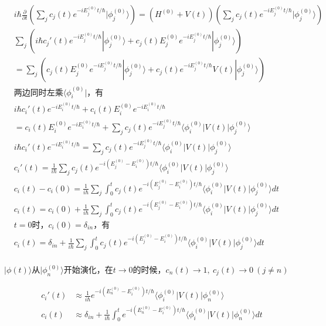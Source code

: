\begin{equation}
    \begin{split}
    & i\hbar \frac{\partial}{\partial t}(\sum_{j} c_j(t) e^{-iE^{(0)}_j t/\hbar} |\phi^{(0)}_j\rangle) = (H^{(0)}+V(t))(\sum_{j} c_j(t) e^{-iE^{(0)}_j t/\hbar} |\phi^{(0)}_j\rangle)\\
    & \sum_{j} (i\hbar c_j'(t) e^{-iE^{(0)}_j t/\hbar} |\phi^{(0)}_j\rangle + c_j(t) E^{(0)}_j e^{-iE^{(0)}_j t/\hbar} |\phi^{(0)}_j\rangle) \\
    &= \sum_{j} (c_j(t) E^{(0)}_j e^{-iE^{(0)}_j t/\hbar} |\phi^{(0)}_j\rangle +  c_j(t) e^{-iE^{(0)}_j t/\hbar} V(t) |\phi^{(0)}_j\rangle)\\
    & \text{两边同时左乘} \langle\phi^{(0)}_i|\text{，有}\\
    &i\hbar c_i'(t) e^{-iE^{(0)}_i t/\hbar} + c_i(t) E^{(0)}_i e^{-iE^{(0)}_i t/\hbar}\\
    &= c_i(t) E^{(0)}_i e^{-iE^{(0)}_i t/\hbar} + \sum_{j} c_j(t) e^{-iE^{(0)}_j t/\hbar} \langle \phi^{(0)}_i| V(t) |\phi^{(0)}_j\rangle \\
    &i\hbar c_i'(t) e^{-iE^{(0)}_i t/\hbar} = \sum_{j} c_j(t) e^{-iE^{(0)}_j t/\hbar} \langle \phi^{(0)}_i| V(t) |\phi^{(0)}_j\rangle \\
    & c_i'(t) = \frac{1}{i\hbar} \sum_{j} c_j(t) e^{-i(E^{(0)}_j - E^{(0)}_i) t/\hbar} \langle \phi^{(0)}_i| V(t) |\phi^{(0)}_j\rangle\\
    & c_i(t) - c_i(0) = \frac{1}{i\hbar} \sum_{j} \int_{0}^{t} c_j(t) e^{-i(E^{(0)}_j - E^{(0)}_i) t/\hbar} \langle \phi^{(0)}_i| V(t) |\phi^{(0)}_j\rangle dt\\
    & c_i(t) = c_i(0) + \frac{1}{i\hbar} \sum_{j} \int_{0}^{t} c_j(t) e^{-i(E^{(0)}_j - E^{(0)}_i) t/\hbar} \langle \phi^{(0)}_i| V(t) |\phi^{(0)}_j\rangle dt\\
    & t=0 \text{时，} c_i(0) = \delta_{in} \text{，有}\\
    & c_i(t) = \delta_{in} + \frac{1}{i\hbar} \sum_{j} \int_{0}^{t} c_j(t) e^{-i(E^{(0)}_j - E^{(0)}_i) t/\hbar} \langle \phi^{(0)}_i| V(t) |\phi^{(0)}_j\rangle dt\\
    \end{split}
\end{equation}

$|\phi(t)\rangle$从$|\phi^{(0)}_n\rangle$开始演化，在$t\to 0$的时候，$c_n(t)\to 1,\ c_j(t)\to 0\ (j\neq n)$

\begin{equation}
    \begin{split}
    c_i'(t) &\approx \frac{1}{i\hbar} e^{-i(E^{(0)}_n - E^{(0)}_i) t/\hbar} \langle \phi^{(0)}_i| V(t) |\phi^{(0)}_n\rangle\\
    c_i(t) &\approx \delta_{in} + \frac{1}{i\hbar} \int_{0}^{t} e^{-i(E^{(0)}_n - E^{(0)}_i) t/\hbar} \langle \phi^{(0)}_i| V(t) |\phi^{(0)}_n\rangle dt\\
    \end{split}
\end{equation}


